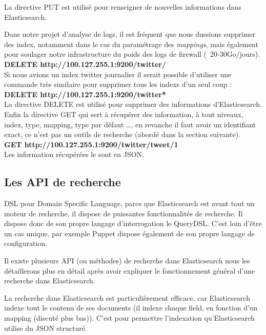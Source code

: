 La directive PUT est utilisé pour renseigner de nouvelles informations dans Elasticsearch.


Dans notre projet d'analyse de logs, il est fréquent que nous dussions supprimer 
des index, notamment dans le cas du paramétrage des \emph{mappings}, mais également
pour soulager notre infrastructure du poids des logs de firewall (~20-30Go/jours).\\

\textbf{DELETE  {\color{grey} http://100.127.255.1:9200}/{\color{red}twitter}/}\\

Si nous avions un index twitter journalier il serait possible d'utiliser une commande
très similaire pour supprimer tous les indexs d'un seul coup :\\

\textbf{DELETE  {\color{grey} http://100.127.255.1:9200}/{\color{red}twitter*}}\\

La directive DELETE est utilisé pour supprimer des informations d'Elasticsearch.\\


Enfin la directive GET qui sert à récupérer des information, à tout niveaux, index,
type, mapping, type par défaut \ldots, en revanche il faut avoir un identifiant exact,
ce n'est pas un outils de recherche (abordé dans la section suivante).\\[5mm]
\textbf{GET  {\color{grey} http://100.127.255.1:9200}/{\color{red}twitter}/{\color{cyan}tweet}/{\color{yellow}1}}\\

Les information récupérées le sont en JSON.

\subsection{Les API de recherche}
DSL pour Domain Specific Language, parce que Elasticsearch est avant tout un moteur 
de recherche, il dispose de puissantes fonctionnalités de recherche. Il dispose donc
de son propre langage d'interrogation le QueryDSL. C'est loin d'être un cas unique,
par exemple Puppet dispose également de son propre langage de configuration.

Il existe plusieurs API (ou méthodes) de recherche dans Elasticsearch nous les  
détaillerons plus en détail après avoir expliquer le fonctionnement général d'une
recherche dans Elasticsearch.

La recherche dans Elasticsearch est particulièrement efficace, car Elasticsearch 
indexe tout le contenu de ses documents (il indexe chaque field, en fonction d'un
mapping (discuté plus bas)).
C'est pour permettre l'indexation qu'Elasticsearch utilise du JSON structuré.



